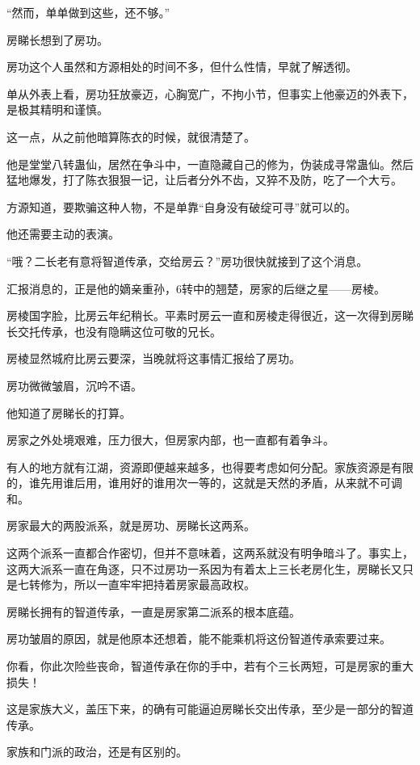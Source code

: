 \begin{this_body}
“然而，单单做到这些，还不够。”

房睇长想到了房功。

房功这个人虽然和方源相处的时间不多，但什么性情，早就了解透彻。

单从外表上看，房功狂放豪迈，心胸宽广，不拘小节，但事实上他豪迈的外表下，是极其精明和谨慎。

这一点，从之前他暗算陈衣的时候，就很清楚了。

他是堂堂八转蛊仙，居然在争斗中，一直隐藏自己的修为，伪装成寻常蛊仙。然后猛地爆发，打了陈衣狠狠一记，让后者分外不齿，又猝不及防，吃了一个大亏。

方源知道，要欺骗这种人物，不是单靠“自身没有破绽可寻”就可以的。

他还需要主动的表演。

“哦？二长老有意将智道传承，交给房云？”房功很快就接到了这个消息。

汇报消息的，正是他的嫡亲重孙，6转中的翘楚，房家的后继之星——房棱。

房棱国字脸，比房云年纪稍长。平素时房云一直和房棱走得很近，这一次得到房睇长交托传承，也没有隐瞒这位可敬的兄长。

房棱显然城府比房云要深，当晚就将这事情汇报给了房功。

房功微微皱眉，沉吟不语。

他知道了房睇长的打算。

房家之外处境艰难，压力很大，但房家内部，也一直都有着争斗。

有人的地方就有江湖，资源即便越来越多，也得要考虑如何分配。家族资源是有限的，谁先用谁后用，谁用好的谁用次一等的，这就是天然的矛盾，从来就不可调和。

房家最大的两股派系，就是房功、房睇长这两系。

这两个派系一直都合作密切，但并不意味着，这两系就没有明争暗斗了。事实上，这两大派系一直在角逐，只不过房功一系因为有着太上三长老房化生，房睇长又只是七转修为，所以一直牢牢把持着房家最高政权。

房睇长拥有的智道传承，一直是房家第二派系的根本底蕴。

房功皱眉的原因，就是他原本还想着，能不能乘机将这份智道传承索要过来。

你看，你此次险些丧命，智道传承在你的手中，若有个三长两短，可是房家的重大损失！

这是家族大义，盖压下来，的确有可能逼迫房睇长交出传承，至少是一部分的智道传承。

家族和门派的政治，还是有区别的。


\end{this_body}
